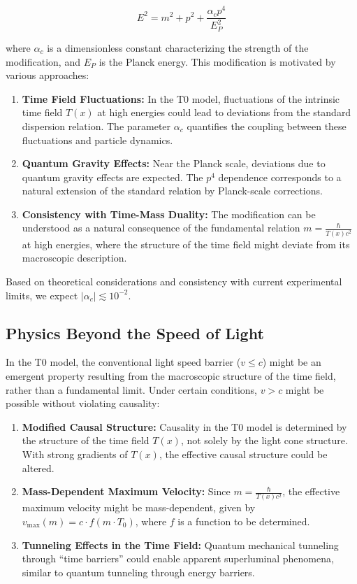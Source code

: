 \documentclass[12pt,a4paper]{article}
\newcommand{\Tfield}{T(x)}
\newcommand{\Tzero}{T_0}
\begin{document}
	\begin{equation}
		E^2 = m^2 + p^2 + \frac{\alpha_c p^4}{E_P^2}
	\end{equation}
	
	where \(\alpha_c\) is a dimensionless constant characterizing the strength of the modification, and \(E_P\) is the Planck energy. This modification is motivated by various approaches:
	
	\begin{enumerate}
		\item \textbf{Time Field Fluctuations:} In the T0 model, fluctuations of the intrinsic time field \(\Tfield\) at high energies could lead to deviations from the standard dispersion relation. The parameter \(\alpha_c\) quantifies the coupling between these fluctuations and particle dynamics.
		\item \textbf{Quantum Gravity Effects:} Near the Planck scale, deviations due to quantum gravity effects are expected. The \(p^4\) dependence corresponds to a natural extension of the standard relation by Planck-scale corrections.
		\item \textbf{Consistency with Time-Mass Duality:} The modification can be understood as a natural consequence of the fundamental relation \(m = \frac{\hbar}{\Tfield c^2}\) at high energies, where the structure of the time field might deviate from its macroscopic description.
	\end{enumerate}
	
	Based on theoretical considerations and consistency with current experimental limits, we expect \(|\alpha_c| \lesssim 10^{-2}\).
	
	\subsection{Physics Beyond the Speed of Light}
	
	In the T0 model, the conventional light speed barrier (\(v \leq c\)) might be an emergent property resulting from the macroscopic structure of the time field, rather than a fundamental limit. Under certain conditions, \(v > c\) might be possible without violating causality:
	
	\begin{enumerate}
		\item \textbf{Modified Causal Structure:} Causality in the T0 model is determined by the structure of the time field \(\Tfield\), not solely by the light cone structure. With strong gradients of \(\Tfield\), the effective causal structure could be altered.
		\item \textbf{Mass-Dependent Maximum Velocity:} Since \(m = \frac{\hbar}{\Tfield c^2}\), the effective maximum velocity might be mass-dependent, given by \(v_{\text{max}}(m) = c \cdot f(m \cdot \Tzero)\), where \(f\) is a function to be determined.
		\item \textbf{Tunneling Effects in the Time Field:} Quantum mechanical tunneling through “time barriers” could enable apparent superluminal phenomena, similar to quantum tunneling through energy barriers.
	\end{enumerate}
	
\end{document}

